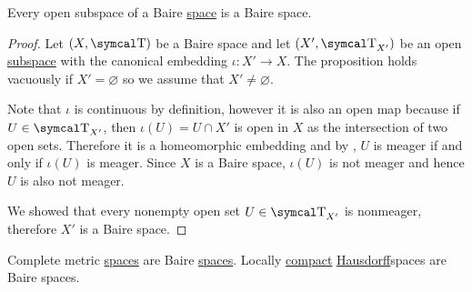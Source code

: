 \begin{proposition}\label{thm:open_subspace_of_baire_space_is_baire}
  Every open subspace of a Baire \hyperref[def:baire_space]{space} is a Baire space.
\end{proposition}
\begin{proof}
  Let \( (X, \CT) \) be a Baire space and let \( (X', \CT_{X'}) \) be an open \hyperref[def:topological_subspace]{subspace} with the canonical embedding \( \iota: X' \to X \). The proposition holds vacuously if \( X' = \varnothing \) so we assume that \( X' \neq \varnothing \).

  Note that \( \iota \) is continuous by definition, however it is also an open map because if \( U \in \CT_{X'} \), then \( \iota(U) = U \cap X' \) is open in \( X \) as the intersection of two open sets. Therefore it is a homeomorphic embedding and by , \( U \) is meager if and only if \( \iota(U) \) is meager. Since \( X \) is a Baire space, \( \iota(U) \) is not meager and hence \( U \) is also not meager.

  We showed that every nonempty open set \( U \in \CT_{X'} \) is nonmeager, therefore \( X' \) is a Baire space.
\end{proof}

\begin{theorem}\label{thm:baire_category_theorem}\cite{Rudin1991}
  \begin{thmenum}
     Complete metric \hyperref[def:complete_metric_space]{spaces} are Baire \hyperref[def:baire_space]{spaces}.
     Locally \hyperref[def:locally_compact_space]{compact} \hyperref[def:separation_axioms/T2]{Hausdorff}spaces are Baire spaces.
  \end{thmenum}
\end{theorem}
